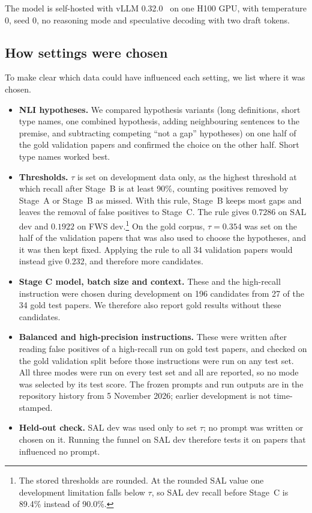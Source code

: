 The model is self-hosted with vLLM 0.32.0~\cite{kwon2023vllm} on one H100 GPU, with temperature 0, seed 0, no reasoning mode and speculative decoding with two draft tokens.

\subsection{How settings were chosen}
\label{sec:choices}

To make clear which data could have influenced each setting, we list where it was chosen.
\begin{itemize}
  \item \textbf{NLI hypotheses.} We compared hypothesis variants (long definitions, short type names, one combined hypothesis, adding neighbouring sentences to the premise, and subtracting competing ``not a gap'' hypotheses) on one half of the gold validation papers and confirmed the choice on the other half. Short type names worked best.
  \item \textbf{Thresholds.} $\tau$ is set on development data only, as the highest threshold at which recall after Stage~B is at least 90\%, counting positives removed by Stage~A or Stage~B as missed. With this rule, Stage~B keeps most gaps and leaves the removal of false positives to Stage~C. The rule gives $0.7286$ on SAL dev and $0.1922$ on FWS dev.\footnote{The stored thresholds are rounded. At the rounded SAL value one development limitation falls below $\tau$, so SAL dev recall before Stage~C is 89.4\% instead of 90.0\%.} On the gold corpus, $\tau = 0.354$ was set on the half of the validation papers that was also used to choose the hypotheses, and it was then kept fixed. Applying the rule to all 34 validation papers would instead give 0.232, and therefore more candidates.
  \item \textbf{Stage C model, batch size and context.} These and the high-recall instruction were chosen during development on 196 candidates from 27 of the 34 gold test papers. We therefore also report gold results without these candidates.
  \item \textbf{Balanced and high-precision instructions.} These were written after reading false positives of a high-recall run on gold test papers, and checked on the gold validation split before those instructions were run on any test set. All three modes were run on every test set and all are reported, so no mode was selected by its test score. The frozen prompts and run outputs are in the repository history from 5 November 2026; earlier development is not time-stamped.
  \item \textbf{Held-out check.} SAL dev was used only to set $\tau$; no prompt was written or chosen on it. Running the funnel on SAL dev therefore tests it on papers that influenced no prompt.
\end{itemize}

